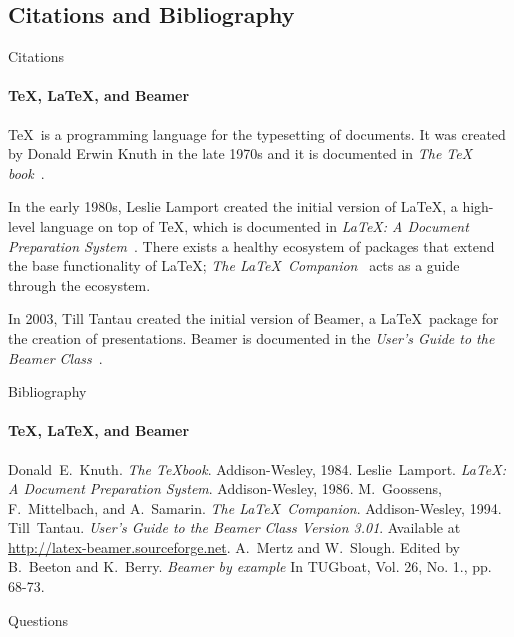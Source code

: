 \documentclass{beamer}
\begin{document}
	\subsection{Citations and Bibliography}
	\begin{frame}[label=citations]{Citations}
		\framesubtitle{\TeX, \LaTeX, and Beamer}

		\justifying\TeX\ is a programming language for the typesetting
		of documents. It was created by Donald Erwin Knuth in the late
		1970s and it is documented in \emph{The \TeX
		book}~\cite{knuth84}.

		In the early 1980s, Leslie Lamport created the initial version
		of \LaTeX, a high-level language on top of \TeX, which is
		documented in \emph{\LaTeX : A Document Preparation
		System}~\cite{lamport94}. There exists a healthy ecosystem of
		packages that extend the base functionality of \LaTeX;
		\emph{The \LaTeX\ Companion}~\cite{MG94} acts as a guide
		through the ecosystem.

		In 2003, Till Tantau created the initial version of Beamer, a
		\LaTeX\ package for the creation of presentations. Beamer is
		documented in the \emph{User's Guide to the Beamer
		Class}~\cite{tantau04}.
	\end{frame}

	\begin{frame}[label=bibliography]{Bibliography}
		\framesubtitle{\TeX, \LaTeX, and Beamer}
		\begin{thebibliography}{9}
				Donald~E.~Knuth.
				\emph{The \TeX book}.
				Addison-Wesley, 1984.
				Leslie~Lamport.
				\emph{\LaTeX : A Document Preparation System}.
				Addison-Wesley, 1986.
				M.~Goossens, F.~Mittelbach, and A.~Samarin.
				\emph{The \LaTeX\ Companion}.
				Addison-Wesley, 1994.
				Till~Tantau.
				\emph{User's Guide to the Beamer Class Version 3.01}.
				Available at \url{http://latex-beamer.sourceforge.net}.
				A.~Mertz and W.~Slough.
				Edited by B.~Beeton and K.~Berry.
				\emph{Beamer by example} In TUGboat,
				Vol. 26, No. 1., pp. 68-73.
		\end{thebibliography}
	\end{frame}

	\begin{frame}{Questions}
	\end{frame}
\end{document}
